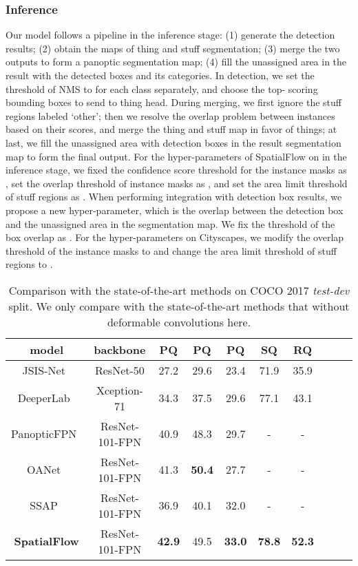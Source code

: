 \documentclass[journal,final]{IEEEtran}
\begin{document}
\subsubsection{Inference} 
Our model follows a pipeline in the inference stage: (1) generate the detection results; (2) obtain the maps of thing and stuff segmentation; (3) merge the two outputs to form a panoptic segmentation map; (4) fill the unassigned area in the result with the detected boxes and its categories. In detection, we set the threshold of NMS to  for each class separately, and choose the top- scoring bounding boxes to send to thing head. During merging, we first ignore the stuff regions labeled `other'; then we resolve the overlap problem between instances based on their scores, and merge the thing and stuff map in favor of things; at last, we fill the unassigned area with detection boxes in the result segmentation map to form the final output. For the hyper-parameters of SpatialFlow on in the inference stage, we fixed the confidence score threshold for the instance masks as , set the overlap threshold of instance masks as , and set the area limit threshold of stuff regions as . When performing integration with detection box results, we propose a new hyper-parameter, which is the overlap between the detection box and the unassigned area in the segmentation map. We fix the threshold of the box overlap as .  For the hyper-parameters on Cityscapes, we modify the overlap threshold of the instance masks to  and change the area limit threshold of stuff regions to .
\begin{table*}
  \centering
   \caption{Comparison with the state-of-the-art methods on COCO 2017 {\em test-dev} split. We only compare with the state-of-the-art methods that without deformable convolutions here. }
  \begin{tabular}{cccccccccc}
    \toprule
    model & backbone & PQ & PQ & PQ & SQ & RQ \\
    \midrule
    \midrule
    JSIS-Net~\cite{jsisnet} & ResNet-50 & 27.2 & 29.6 & 23.4 & 71.9 & 35.9 \\
    DeeperLab~\cite{deeperlab} & Xception-71 & 34.3 & 37.5 & 29.6 & 77.1 & 43.1 \\
    PanopticFPN~\cite{panopticfpn} & ResNet-101-FPN & 40.9 & 48.3 & 29.7 & - & -  \\
    OANet~\cite{panopticranking} & ResNet-101-FPN & 41.3 & \textbf{50.4} & 27.7 & - & - \\
    SSAP~\cite{ssap} & ResNet-101-FPN & 36.9 & 40.1 & 32.0 & - & - \\
    \textbf{SpatialFlow} & ResNet-101-FPN & \textbf{42.9} & 49.5 & \textbf{33.0} & \textbf{78.8} & \textbf{52.3} \\
    \bottomrule
  \end{tabular}
   \label{tab2}
\end{table*}
\end{document}
